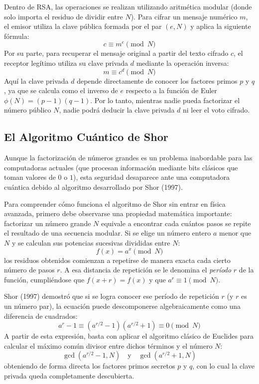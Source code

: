 Dentro de RSA, las operaciones se realizan utilizando aritmética modular (donde solo importa el residuo de dividir entre $N$). Para cifrar un mensaje numérico $m$, el emisor utiliza la clave pública formada por el par $(e, N)$ y aplica la siguiente fórmula:
\begin{equation}
	c \equiv m^e \pmod N
\end{equation}
Por su parte, para recuperar el mensaje original a partir del texto cifrado $c$, el receptor legítimo utiliza su clave privada $d$ mediante la operación inversa:
\begin{equation}
	m \equiv c^d \pmod N
\end{equation}
Aquí la clave privada $d$ depende directamente de conocer los factores primos $p$ y $q$, ya que se calcula como el inverso de $e$ respecto a la función de Euler $\phi(N) = (p-1)(q-1)$. Por lo tanto, mientras nadie pueda factorizar el número público $N$, nadie podrá deducir la clave privada $d$ ni leer el voto cifrado.

\subsection{El Algoritmo Cuántico de Shor}

Aunque la factorización de números grandes es un problema inabordable para las computadoras actuales (que procesan información mediante bits clásicos que toman valores de $0$ o $1$), esta seguridad desaparece ante una computadora cuántica debido al algoritmo desarrollado por Shor (1997).

Para comprender cómo funciona el algoritmo de Shor sin entrar en física avanzada, primero debe observarse una propiedad matemática importante: factorizar un número grande $N$ equivale a encontrar cada cuántos pasos se repite el resultado de una secuencia modular. Si se elige un número entero $a$ menor que $N$ y se calculan sus potencias sucesivas divididas entre $N$:
\begin{equation}
	f(x) = a^x \pmod N
\end{equation}
los residuos obtenidos comienzan a repetirse de manera exacta cada cierto número de pasos $r$. A esa distancia de repetición se le denomina el \textit{período} $r$ de la función, cumpliéndose que $f(x + r) = f(x)$ y que $a^r \equiv 1 \pmod N$.

Shor (1997) demostró que si se logra conocer ese período de repetición $r$ (y $r$ es un número par), la ecuación puede descomponerse algebraicamente como una diferencia de cuadrados:
\begin{equation}
	a^r - 1 \equiv (a^{r/2} - 1)(a^{r/2} + 1) \equiv 0 \pmod N
\end{equation}
A partir de esta expresión, basta con aplicar el algoritmo clásico de Euclides para calcular el máximo común divisor entre dichos términos y el número $N$:
\begin{equation}
	\gcd(a^{r/2} - 1, N) \quad \text{y} \quad \gcd(a^{r/2} + 1, N)
\end{equation}
obteniendo de forma directa los factores primos secretos $p$ y $q$, con lo cual la clave privada queda completamente descubierta.

